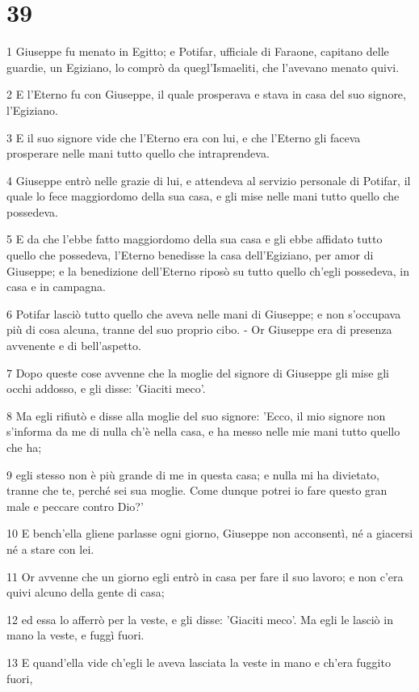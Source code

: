 \chapter{39}

\par 1 Giuseppe fu menato in Egitto; e Potifar, ufficiale di Faraone, capitano delle guardie, un Egiziano, lo comprò da quegl'Ismaeliti, che l'avevano menato quivi.
\par 2 E l'Eterno fu con Giuseppe, il quale prosperava e stava in casa del suo signore, l'Egiziano.
\par 3 E il suo signore vide che l'Eterno era con lui, e che l'Eterno gli faceva prosperare nelle mani tutto quello che intraprendeva.
\par 4 Giuseppe entrò nelle grazie di lui, e attendeva al servizio personale di Potifar, il quale lo fece maggiordomo della sua casa, e gli mise nelle mani tutto quello che possedeva.
\par 5 E da che l'ebbe fatto maggiordomo della sua casa e gli ebbe affidato tutto quello che possedeva, l'Eterno benedisse la casa dell'Egiziano, per amor di Giuseppe; e la benedizione dell'Eterno riposò su tutto quello ch'egli possedeva, in casa e in campagna.
\par 6 Potifar lasciò tutto quello che aveva nelle mani di Giuseppe; e non s'occupava più di cosa alcuna, tranne del suo proprio cibo. - Or Giuseppe era di presenza avvenente e di bell'aspetto.
\par 7 Dopo queste cose avvenne che la moglie del signore di Giuseppe gli mise gli occhi addosso, e gli disse: 'Giaciti meco'.
\par 8 Ma egli rifiutò e disse alla moglie del suo signore: 'Ecco, il mio signore non s'informa da me di nulla ch'è nella casa, e ha messo nelle mie mani tutto quello che ha;
\par 9 egli stesso non è più grande di me in questa casa; e nulla mi ha divietato, tranne che te, perché sei sua moglie. Come dunque potrei io fare questo gran male e peccare contro Dio?'
\par 10 E bench'ella gliene parlasse ogni giorno, Giuseppe non acconsentì, né a giacersi né a stare con lei.
\par 11 Or avvenne che un giorno egli entrò in casa per fare il suo lavoro; e non c'era quivi alcuno della gente di casa;
\par 12 ed essa lo afferrò per la veste, e gli disse: 'Giaciti meco'. Ma egli le lasciò in mano la veste, e fuggì fuori.
\par 13 E quand'ella vide ch'egli le aveva lasciata la veste in mano e ch'era fuggito fuori,
